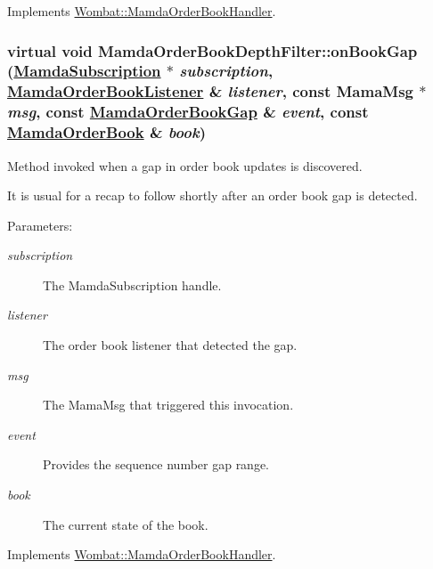 Implements \hyperlink{classWombat_1_1MamdaOrderBookHandler_2035c156ec11491cb9b7af92a592f278}{Wombat::Mamda\-Order\-Book\-Handler}.\hypertarget{classMamdaOrderBookDepthFilter_ae2a8192b2034af1d1b3d6ef71521e8a}{
\subsubsection[onBookGap]{\setlength{\rightskip}{0pt plus 5cm}virtual void Mamda\-Order\-Book\-Depth\-Filter::on\-Book\-Gap (\hyperlink{classWombat_1_1MamdaSubscription}{Mamda\-Subscription} $\ast$ {\em subscription}, \hyperlink{classWombat_1_1MamdaOrderBookListener}{Mamda\-Order\-Book\-Listener} \& {\em listener}, const Mama\-Msg $\ast$ {\em msg}, const \hyperlink{classWombat_1_1MamdaOrderBookGap}{Mamda\-Order\-Book\-Gap} \& {\em event}, const \hyperlink{classWombat_1_1MamdaOrderBook}{Mamda\-Order\-Book} \& {\em book})}}
\label{classMamdaOrderBookDepthFilter_ae2a8192b2034af1d1b3d6ef71521e8a}


Method invoked when a gap in order book updates is discovered. 

It is usual for a recap to follow shortly after an order book gap is detected.

\begin{Desc}
\item[Parameters:]
\begin{description}
\item[{\em subscription}]The Mamda\-Subscription handle. \item[{\em listener}]The order book listener that detected the gap. \item[{\em msg}]The Mama\-Msg that triggered this invocation. \item[{\em event}]Provides the sequence number gap range. \item[{\em book}]The current state of the book. \end{description}
\end{Desc}


Implements \hyperlink{classWombat_1_1MamdaOrderBookHandler_54d949ce0ddfe085be5c6112a5682cec}{Wombat::Mamda\-Order\-Book\-Handler}.